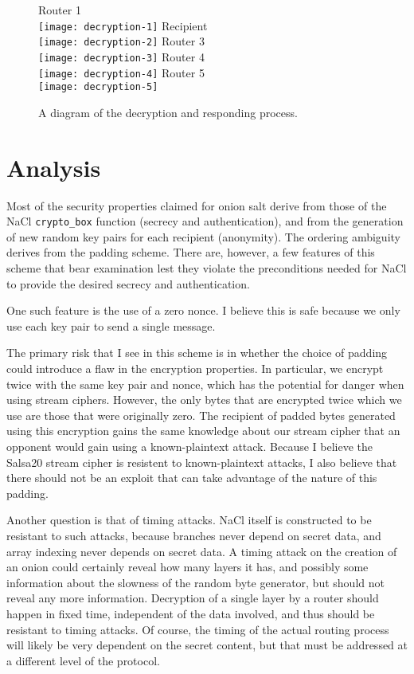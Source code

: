 \documentclass[letterpaper,twocolumn,amsmath,amssymb,pre,aps,10pt]{revtex4-1}
\begin{document}
\begin{figure*}
  \begin{center}
    Router 1\\
    \texttt{[image: decryption-1]}
    Recipient\\
    \texttt{[image: decryption-2]}
    Router 3\\
    \texttt{[image: decryption-3]}
    Router 4\\
    \texttt{[image: decryption-4]}
    Router 5\\
    \texttt{[image: decryption-5]}
  \end{center}
  \caption{A diagram of the decryption and responding
    process.}\label{fig:decryption-and-responding}
\end{figure*}

\section{Analysis}

Most of the security properties claimed for onion salt derive from
those of the NaCl \texttt{crypto\_box} function (secrecy and
authentication), and from the generation of new random key pairs for
each recipient (anonymity).  The ordering ambiguity derives from the
padding scheme.  There are, however, a few features of this scheme
that bear examination lest they violate the preconditions needed for
NaCl to provide the desired secrecy and authentication.

One such feature is the use of a zero nonce.  I believe this is safe
because we only use each key pair to send a single message.

The primary risk that I see in this scheme is in whether the choice of
padding could introduce a flaw in the encryption properties.  In
particular, we encrypt twice with the same key pair and nonce, which
has the potential for danger when using stream ciphers.  However, the
only bytes that are encrypted twice which we use are those that were
originally zero.  The recipient of padded bytes generated using this
encryption gains the same knowledge about our stream cipher that an
opponent would gain using a known-plaintext attack.  Because I believe
the Salsa20 stream cipher is resistent to known-plaintext attacks, I
also believe that there should not be an exploit that can take
advantage of the nature of this padding.

Another question is that of timing attacks.  NaCl itself is
constructed to be resistant to such attacks, because branches never
depend on secret data, and array indexing never depends on secret
data.  A timing attack on the creation of an onion could certainly
reveal how many layers it has, and possibly some information about the
slowness of the random byte generator, but should not reveal any more
information.  Decryption of a single layer by a router should happen
in fixed time, independent of the data involved, and thus should be
resistant to timing attacks.  Of course, the timing of the actual
routing process will likely be very dependent on the secret content,
but that must be addressed at a different level of the protocol.
\end{document}
